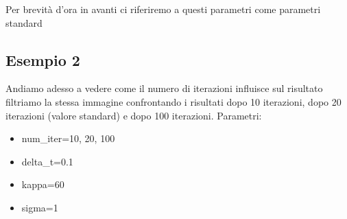 Per brevità d'ora in avanti ci riferiremo a questi parametri come parametri standard

\newpage
\subsection{Esempio 2}
Andiamo adesso a vedere come il numero di iterazioni influisce sul risultato\\
filtriamo la stessa immagine confrontando i risultati dopo 10 iterazioni, dopo 20 iterazioni (valore standard) e dopo 100 iterazioni.
Parametri:
\begin{itemize}
    \item num\_iter=10, 20, 100
    \item delta\_t=0.1
    \item kappa=60
    \item sigma=1
\end{itemize}

